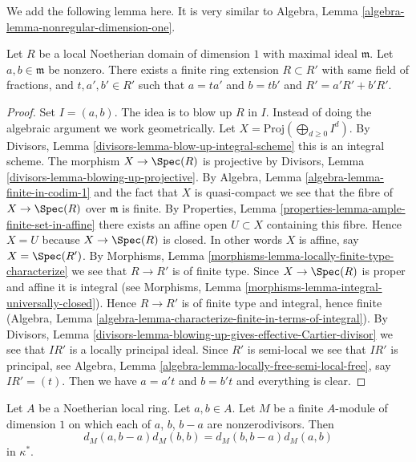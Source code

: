\noindent
We add the following lemma here. It is very similar to
Algebra, Lemma \ref{algebra-lemma-nonregular-dimension-one}.

\begin{lemma}
\label{lemma-Noetherian-domain-dim-1-two-elements}
Let $R$ be a local Noetherian domain of dimension $1$
with maximal ideal $\mathfrak m$.
Let $a, b \in \mathfrak m$ be nonzero. There exists a finite
ring extension $R \subset R'$ with same field of fractions,
and $t, a', b' \in R'$ such that $a = ta'$ and $b = tb'$ and
$R' = a'R' + b'R'$.
\end{lemma}

\begin{proof}
Set $I = (a, b)$. The idea is to blow up $R$ in $I$.
Instead of doing the algebraic argument we work geometrically.
Let $X = \text{Proj}(\bigoplus_{d \geq 0} I^d)$.
By Divisors, Lemma \ref{divisors-lemma-blow-up-integral-scheme}
this is an integral scheme.
The morphism $X \to \Spec(R)$ is projective by
Divisors, Lemma \ref{divisors-lemma-blowing-up-projective}.
By Algebra, Lemma \ref{algebra-lemma-finite-in-codim-1} and the fact that
$X$ is quasi-compact we see that the fibre of $X \to \Spec(R)$
over $\mathfrak m$ is finite.
By Properties, Lemma \ref{properties-lemma-ample-finite-set-in-affine}
there exists an affine open $U \subset X$
containing this fibre.
Hence $X = U$ because $X \to \Spec(R)$ is closed.
In other words $X$ is affine, say $X = \Spec(R')$.
By Morphisms, Lemma \ref{morphisms-lemma-locally-finite-type-characterize}
we see that $R \to R'$ is of finite type. Since $X \to \Spec(R)$ is
proper and affine it is integral (see
Morphisms, Lemma \ref{morphisms-lemma-integral-universally-closed}).
Hence $R \to R'$ is of finite type and integral, hence finite
(Algebra, Lemma \ref{algebra-lemma-characterize-finite-in-terms-of-integral}).
By Divisors,
Lemma \ref{divisors-lemma-blowing-up-gives-effective-Cartier-divisor}
we see that $IR'$ is a locally principal ideal.
Since $R'$ is semi-local we see that $IR'$ is principal,
see Algebra, Lemma \ref{algebra-lemma-locally-free-semi-local-free},
say $IR' = (t)$. Then we have $a = a't$ and $b = b't$ and everything is
clear.
\end{proof}

\begin{lemma}
\label{lemma-symbol-is-steinberg-prepare}
Let $A$ be a Noetherian local ring.
Let $a, b \in A$.
Let $M$ be a finite $A$-module of dimension $1$ on
which each of $a$, $b$, $b - a$ are nonzerodivisors.
Then
$$
d_M(a, b - a)d_M(b, b) = d_M(b, b - a)d_M(a, b)
$$
in $\kappa^*$.
\end{lemma}


